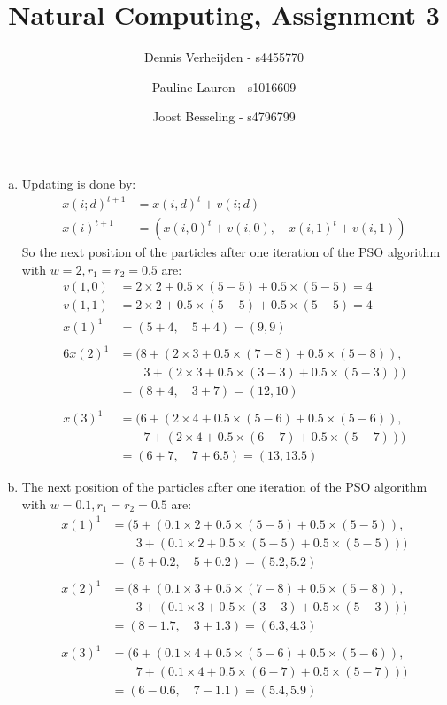 \documentclass[11pt]{article}
\title{Natural Computing, Assignment 3}
\author{Dennis Verheijden - s4455770 \and Pauline Lauron - s1016609 \and Joost Besseling - s4796799}
\begin{document}
\maketitle

\section{}
\begin{enumerate}[(a)]
\item Updating is done by:
\begin{align}
x(i;d)^{t+1} &= x(i,d)^t + v(i;d) \\
x(i)^{t+1} &= (x(i,0)^t + v(i,0), \quad x(i,1)^t + v(i,1)) 
\end{align}
So the next position of the particles after one iteration of the PSO algorithm with $w=2, r_1 = r_2 = 0.5$ are:
\begin{align*}
v(1,0) &= 2 \times 2 + 0.5 \times (5 - 5) + 0.5 \times (5 - 5) = 4 \\
v(1,1) &= 2 \times 2 + 0.5 \times (5 - 5) + 0.5 \times (5 - 5) = 4 \\
x(1)^1 &= (5 + 4, \quad 5 + 4) = (9, 9) \\ \\6
x(2)^1 &= (8 + (2 \times 3 + 0.5 \times (7 - 8) + 0.5 \times (5 - 8)), \\
 &\qquad   3 + (2 \times 3 + 0.5 \times (3 - 3) + 0.5 \times (5 - 3))) \\
       &= (8 + 4, \quad 3 + 7) = (12, 10) \\ \\
x(3)^1 &= (6 + (2 \times 4 + 0.5 \times (5 - 6) + 0.5 \times (5 - 6)), \\
 &\qquad   7 + (2 \times 4 + 0.5 \times (6 - 7) + 0.5 \times (5 - 7))) \\
       &= (6 + 7, \quad 7 + 6.5) = (13, 13.5)
\end{align*}

\item The next position of the particles after one iteration of the PSO algorithm with $w=0.1, r_1 = r_2 = 0.5$ are:
\begin{align*}
x(1)^1 &= (5 + (0.1 \times 2 + 0.5 \times (5 - 5) + 0.5 \times (5 - 5)), \\
 &\qquad   3 + (0.1 \times 2 + 0.5 \times (5 - 5) + 0.5 \times (5 - 5))) \\
       &= (5 + 0.2, \quad 5 + 0.2) = (5.2, 5.2) \\ \\
x(2)^1 &= (8 + (0.1 \times 3 + 0.5 \times (7 - 8) + 0.5 \times (5 - 8)), \\
 &\qquad   3 + (0.1 \times 3 + 0.5 \times (3 - 3) + 0.5 \times (5 - 3))) \\
       &= (8 - 1.7, \quad 3 + 1.3) = (6.3, 4.3) \\ \\
x(3)^1 &= (6 + (0.1 \times 4 + 0.5 \times (5 - 6) + 0.5 \times (5 - 6)), \\
 &\qquad   7 + (0.1 \times 4 + 0.5 \times (6 - 7) + 0.5 \times (5 - 7))) \\
       &= (6 - 0.6 , \quad 7 - 1.1) = (5.4, 5.9)
\end{align*}


\end{enumerate}
\end{document}
